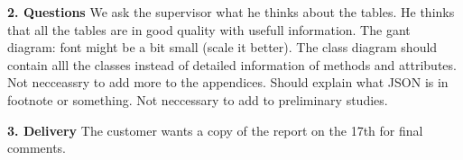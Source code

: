 \textbf{2. Questions}\newline
We ask the supervisor what he thinks about the tables. He thinks that all the tables are in
good quality with usefull information. The gant diagram: font might be a bit small (scale it better).
The class diagram should contain alll the classes instead of detailed information of methods and attributes.
Not necceassry to add more to the appendices.
Should explain what JSON is in footnote or something. Not neccessary to add to preliminary studies.

\textbf{3. Delivery}\newline
The customer wants a copy of the report on the 17th for final comments.